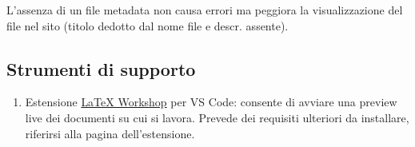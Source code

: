 L'assenza di un file metadata non causa errori ma peggiora la visualizzazione del file nel sito (titolo dedotto dal nome file e descr. assente).

\subsection{Strumenti di supporto}\label{docpub_tech}

\begin{enumerate}
    \item Estensione \href{https://marketplace.visualstudio.com/items?itemName=James-Yu.latex-workshop}{LaTeX Workshop} per VS Code: consente di avviare una preview live dei documenti su cui si lavora. Prevede dei requisiti ulteriori da installare, riferirsi alla pagina dell'estensione.
\end{enumerate}